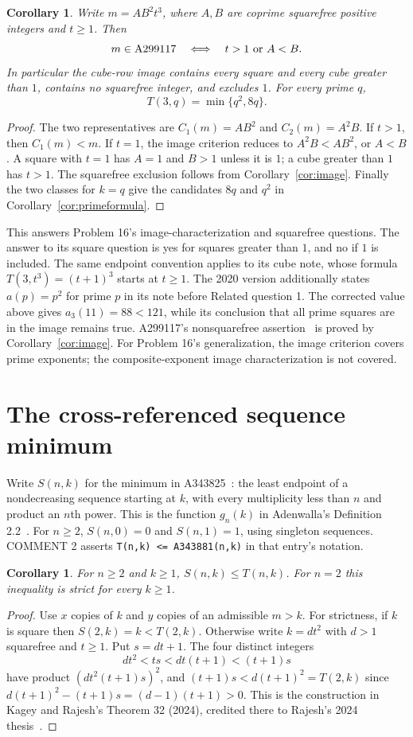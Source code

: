 \documentclass[11pt]{article}
\newtheorem{corollary}[theorem]{Corollary}
\begin{document}
\begin{corollary}\label{cor:cubeimage}
Write $m=A B^2t^3$, where $A,B$ are coprime squarefree positive integers
and $t\ge1$. Then
\[
 m\in\operatorname{A299117}
 \quad\Longleftrightarrow\quad t>1\ \hbox{or}\ A<B.
\]
In particular the cube-row image contains every square and every cube
greater than $1$, contains no squarefree integer, and excludes $1$.
For every prime $q$,
\[
 T(3,q)=\min\{q^2,8q\}.
\]
\end{corollary}
\begin{proof}
The two representatives are $C_1(m)=AB^2$ and $C_2(m)=A^2B$.
If $t>1$, then $C_1(m)<m$. If $t=1$, the image criterion reduces to
$A^2B<AB^2$, or $A<B$. A square with $t=1$ has $A=1$ and $B>1$
unless it is $1$; a cube greater than $1$ has $t>1$.
The squarefree exclusion follows from Corollary~\ref{cor:image}.
Finally the two classes for $k=q$ give the candidates $8q$ and $q^2$
in Corollary~\ref{cor:primeformula}.
\end{proof}
This answers Problem 16's image-characterization and squarefree questions.
The answer to its square question is yes for squares greater than $1$,
and no if $1$ is included. The same endpoint convention applies to its
cube note, whose formula $T(3,t^3)=(t+1)^3$ starts at $t\ge1$.
The 2020 version additionally states $a(p)=p^2$ for prime $p$ in its
note before Related question 1. The corrected value above gives
$a_3(11)=88<121$, while its conclusion that all prime squares are in
the image remains true. A299117's nonsquarefree assertion~\cite{a299117}
is proved by Corollary~\ref{cor:image}.
For Problem 16's generalization, the image criterion covers prime
exponents; the composite-exponent image characterization is not covered.

\section{The cross-referenced sequence minimum}
Write $S(n,k)$ for the minimum in A343825~\cite{a343825}: the least
endpoint of a nondecreasing sequence starting at $k$, with every multiplicity
less than $n$ and product an $n$th power. This is the function $g_n(k)$
in Adenwalla's Definition 2.2~\cite{adenwalla}. For $n\ge2$,
$S(n,0)=0$ and $S(n,1)=1$, using singleton sequences.
COMMENT 2 asserts \texttt{T(n,k) <= A343881(n,k)} in that entry's notation.

\begin{corollary}\label{cor:comparison}
For $n\ge2$ and $k\ge1$, $S(n,k)\le T(n,k)$.
For $n=2$ this inequality is strict for every $k\ge1$.
\end{corollary}
\begin{proof}
Use $x$ copies of $k$ and $y$ copies of an admissible $m>k$.
For strictness, if $k$ is square then $S(2,k)=k<T(2,k)$.
Otherwise write $k=dt^2$ with $d>1$ squarefree and $t\ge1$.
Put $s=dt+1$. The four distinct integers
\[
 dt^2<ts<dt(t+1)<(t+1)s
\]
have product $(dt^2(t+1)s)^2$, and
$(t+1)s<d(t+1)^2=T(2,k)$ since
$d(t+1)^2-(t+1)s=(d-1)(t+1)>0$.
This is the construction in Kagey and Rajesh's Theorem 32 (2024),
credited there to Rajesh's 2024 thesis~\cite{kageyrajesh}.
\end{proof}
\end{document}
